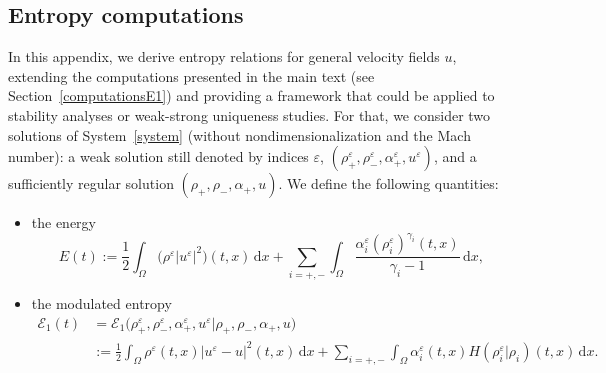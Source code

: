 \documentclass[11pt, twoside, a4paper]{article}
\theoremstyle{plain}
\theoremstyle{remark}
\numberwithin{equation}{section}
\def\EE{{\mathcal E}}
\newcommand{\dd}{\,\mathrm{d}}
\renewcommand{\epsilon}{\varepsilon}
\newcommand{\eps}{\varepsilon}
\begin{document}
\begin{appendices}

\section{Entropy computations}\label{app1}

In this appendix, we derive entropy relations for general velocity fields $u$, extending the computations presented in the main text (see Section~\ref{computationsE1}) and providing a framework that could be applied to stability analyses or weak-strong uniqueness studies. For that, we consider two solutions of System~\eqref{system} (without nondimensionalization and the Mach number): a weak solution still denoted by indices $\eps$, $(\rho^{\epsilon}_+,\rho^{\epsilon}_-,\alpha^{\epsilon}_+,u^{\epsilon})$, and a sufficiently regular solution $(\rho_+,\rho_-,\alpha_+,u)$. We define the following quantities:
\begin{itemize}
 \item the energy
 \begin{equation*}
 E(t) := \frac{1}{2} \int_{\Omega} \Big(\rho^\varepsilon |u^\eps|^2\Big)(t,x) \dd x
 + \sum_{i=+,-} \int_{\Omega} \frac{\alpha_i^{\epsilon}(\rho_i^{\epsilon})^{\gamma_i}(t,x)}{\gamma_i-1} \dd x ,
 \end{equation*}
 \item the modulated entropy
 \begin{equation*}
 \begin{aligned}
 \EE_1(t) &= \EE_1\Big(\rho^{\epsilon}_+,\rho^{\epsilon}_-,\alpha^{\epsilon}_+,u^{\epsilon}| \rho_+,\rho_-,\alpha_+,u\Big) \\
 &:=
 \frac{1}{2} \int_{\Omega} \rho^{\epsilon}(t,x) |u^{\epsilon} - u|^2(t,x)\dd x 
 + \sum_{i=+,-} \int_{\Omega} \alpha_i^{\epsilon}(t,x) H(\rho_i^\eps | \rho_i)(t,x)\dd x .
 \end{aligned}
 \end{equation*}
\end{itemize}


\end{appendices}
\end{document}
